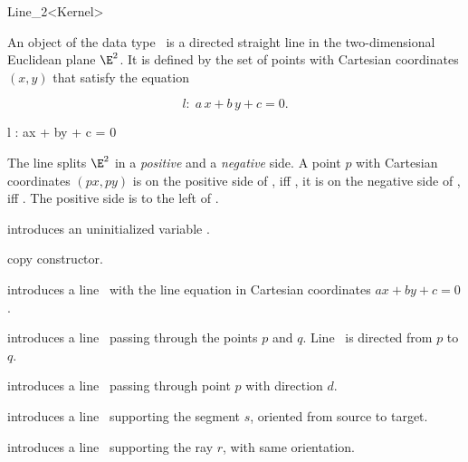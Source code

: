 \begin{ccRefClass} {Line_2<Kernel>}

\ccDefinition
An object  of the data type \ccRefName\ is a directed
straight line in the two-dimensional Euclidean plane $\E^2$. It is
defined by the set of points with Cartesian coordinates $(x,y)$ 
that satisfy the equation 
\begin{ccTexOnly}
\[ l:\; a\, x +b\, y +c = 0. \]
\end{ccTexOnly}
\begin{ccHtmlOnly}
 l : ax + by + c = 0 
\end{ccHtmlOnly}
 
The line splits $\E^2$ in a {\em positive} and a {\em negative}
side. A point $p$ with Cartesian coordinates 
$(px, py)$ is on the positive side of , iff
, it is
on the negative side of , iff 
.
The positive side is to the left of .

\ccCreation
{}

\ccHidden {}
             {introduces an uninitialized variable \ccVar.}

\ccHidden {}
            {copy constructor.}

            {introduces a line \ccVar\ with the line equation in Cartesian
              coordinates $ax +by +c = 0$.}

            {introduces a line \ccVar\ passing through the points $p$ and $q$. 
             Line \ccVar\ is directed from $p$ to $q$.}

            {introduces a line \ccVar\ passing through point $p$ with 
             direction $d$.}

            {introduces a line \ccVar\ supporting the segment $s$,
            oriented from source to target.}

            {introduces a line \ccVar\ supporting the ray $r$,
            with same orientation.}

\ccOperations


\end{ccRefClass}
